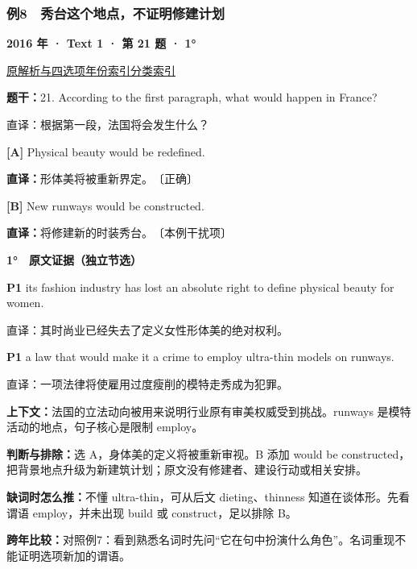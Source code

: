 \documentclass[11pt,a4paper]{article}
\begin{document}
\subsubsection{例8　秀台这个地点，不证明修建计划}\label{case-2016-T1-Q21}
\noindent\textbf{2016 年 · Text 1 · 第 21 题 · 1°}\par\noindent \href{https://zj139.github.io/math-notes/english/199237d5df9b8cc835b3f5e8/\#q21}{原解析与四选项}\quad \hyperref[idx-2016-T1-Q21]{年份索引}\quad \hyperref[class-R04]{分类索引}\par\smallskip
\noindent\textbf{题干：}21. According to the first paragraph, what would happen in France?\par
直译：根据第一段，法国将会发生什么？\par
{}\noindent\textbf{[A]} Physical beauty would be redefined.\par\nopagebreak
\noindent\textbf{直译：}形体美将被重新界定。　〔正确〕\par
{}\noindent\textbf{[B]} New runways would be constructed.\par\nopagebreak
\noindent\textbf{直译：}将修建新的时装秀台。　〔本例干扰项〕\par
\begin{evidence}\textbf{1°　原文证据（独立节选）}\par
\textbf{P1} its fashion industry has lost an absolute right to define physical beauty for women.\par 直译：其时尚业已经失去了定义女性形体美的绝对权利。\par
\textbf{P1} a law that would make it a crime to employ ultra-thin models on runways.\par 直译：一项法律将使雇用过度瘦削的模特走秀成为犯罪。\par
\end{evidence}
\noindent\textbf{上下文：}法国的立法动向被用来说明行业原有审美权威受到挑战。runways 是模特活动的地点，句子核心是限制 employ。\par
\noindent\textbf{判断与排除：}选 A，身体美的定义将被重新审视。B 添加 would be constructed，把背景地点升级为新建筑计划；原文没有修建者、建设行动或相关安排。\par
\noindent\textbf{缺词时怎么推：}不懂 ultra-thin，可从后文 dieting、thinness 知道在谈体形。先看谓语 employ，并未出现 build 或 construct，足以排除 B。\par
\noindent\textbf{跨年比较：}对照例7：看到熟悉名词时先问“它在句中扮演什么角色”。名词重现不能证明选项新加的谓语。\par
\clearpage
\end{document}
